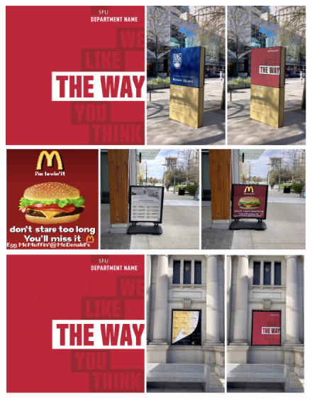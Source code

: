 \documentclass[sigconf]{acmart}
\begin{document}
\newpage


\begin{figure}[t]
  \centering
  \includegraphics[width=\linewidth]{fig/figure4.png}
  \includegraphics[width=\linewidth]{fig/figure1.png}
  \includegraphics[width=\linewidth]{fig/figure5.png}
  \label{fig:pipeline}
   \vspace{-0.2cm}
\end{figure}

\newpage
\end{document}
